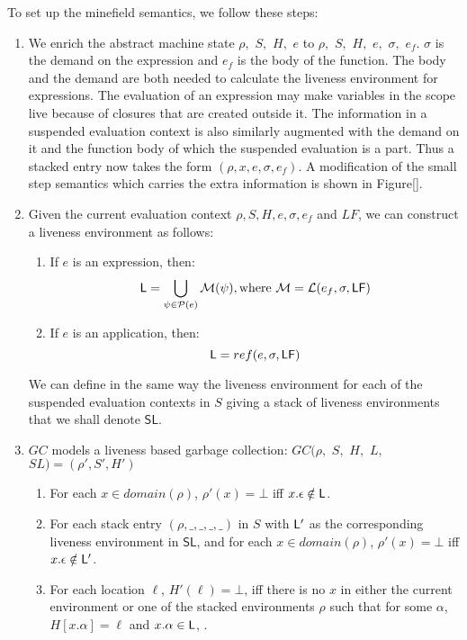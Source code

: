 \documentclass[9pt]{sigplanconf}
\begin{document}
{To set up the minefield semantics, we follow these steps:
\begin{enumerate}
\item We enrich  the abstract machine state $\rho,$ $S,$  $ H,$ $e$ to
  $\rho,$ $S,$ $H,$  $e,$ $\sigma,$ $e_f$.  $\sigma$ is  the demand on
  the expression and $e_f$ is the  body of the function.  The body and
  the demand are both needed to calculate the liveness environment for
  expressions.  The evaluation of  an expression may make variables in
  the scope live because of closures that are created outside it.  The
  information  in a  suspended  evaluation context  is also  similarly
  augmented with the demand on it and the function body of which the
  suspended evaluation is a part.  Thus a stacked entry now takes the
  form $(\rho, x, e, \sigma, e_f)$. A modification of the small step
  semantics which carries the extra information is shown in Figure[].
\item Given the current evaluation context $\rho, S, H, e, \sigma,
  e_f$ and $LF$, we can construct a liveness environment as follows:
  \begin{enumerate}
  \item If $e$ is an expression, then:  
  $$ \mathsf{L} = \bigcup_{\psi \in \mathcal{P}(e)} \mathcal{M}(\psi),
    \text{where }
  \mathcal{M} = \mathcal{L}(e_f, \sigma, \mathsf{LF})$$
\item If $e$ is an application, then:  
  $$ \mathsf{L} = ref(e, \sigma, \mathsf{LF})$$
  \end{enumerate}
We can define in the same way the liveness environment for each of the
suspended  evaluation contexts in  $S$  giving  a  stack of  liveness
environments that we shall denote $\mathsf{SL}$.
\item $GC$ models a liveness based garbage collection:
$GC(\rho,$ $ S,$ $ H,$ $ L,$ $ SL) = (\rho', S', H')$ 
  \begin{enumerate}
  \item For each $x \in domain(\rho)$,  $\rho'(x)=\bot$ iff $x.\epsilon
    \notin \mathsf{L}$.
\item For each stack entry $(\rho,\_,\_,\_,\_)$ in $S$ with $\mathsf{L}'$ as
  the corresponding liveness environment in $\mathsf{SL}$,  and for each $x
  \in domain(\rho)$,  $\rho'(x)=\bot$
  iff $x.\epsilon \notin \mathsf{L}'$.
\item For each location $\ell$, $H'(\ell) = \bot$, iff  there is no
  $x$ in either the current environment or one of the stacked
  environments $\rho$ such that for some $\alpha$, $H[x.\alpha] =
  \ell$  and $x.\alpha \in \mathsf{L}$, .
  \end{enumerate}
\end{enumerate}

}
\end{document}
